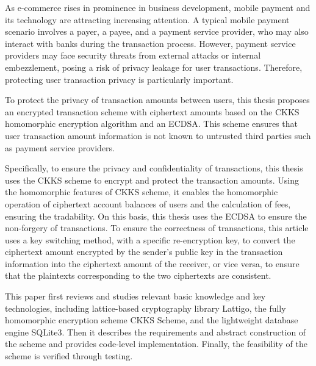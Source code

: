 \begin{enabstract}
As e-commerce rises in prominence in business development, mobile payment and its technology are attracting increasing attention. A typical mobile payment scenario involves a payer, a payee, and a payment service provider, who may also interact with banks during the transaction process. However, payment service providers may face security threats from external attacks or internal embezzlement, posing a risk of privacy leakage for user transactions. Therefore, protecting user transaction privacy is particularly important.

To protect the privacy of transaction amounts between users, this thesis proposes an encrypted transaction scheme with ciphertext amounts based on the CKKS homomorphic encryption algorithm and an ECDSA. This scheme ensures that user transaction amount information is not known to untrusted third parties such as payment service providers. 

Specifically, to ensure the privacy and confidentiality of transactions, this thesis uses the CKKS scheme to encrypt and protect the transaction amounts. Using the homomorphic features of CKKS scheme, it enables the homomorphic operation of ciphertext account balances of users and the calculation of fees, ensuring the tradability. On this basis, this thesis uses the ECDSA to ensure the non-forgery of transactions. To ensure the correctness of transactions, this article uses a key switching method, with a specific re-encryption key, to convert the ciphertext amount encrypted by the sender's public key in the transaction information into the ciphertext amount of the receiver, or vice versa, to ensure that the plaintexts corresponding to the two ciphertexts are consistent.

This paper first reviews and studies relevant basic knowledge and key technologies, including lattice-based cryptography library Lattigo, the fully homomorphic encryption scheme CKKS Scheme, and the lightweight database engine SQLite3. Then it describes the requirements and abstract construction of the scheme and provides code-level implementation. Finally, the feasibility of the scheme is verified through testing.
\end{enabstract}
